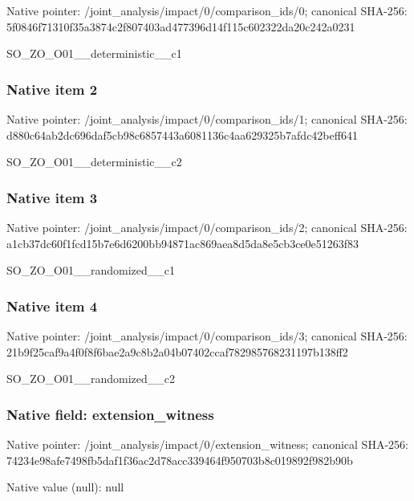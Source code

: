 \documentclass[10pt,a4paper]{article}
\begin{document}
Native pointer: /joint\_analysis/impact/0\allowbreak{}/comparison\_ids/0; canonical SHA-256: 5f0846f71310f35a3874c2f8\allowbreak{}07403ad477396d14f115c602\allowbreak{}322da20c242a0231


SO\_ZO\_O01\_\_deterministic\_\_c1


\subsubsection{Native item 2}


Native pointer: /joint\_analysis/impact/0\allowbreak{}/comparison\_ids/1; canonical SHA-256: d880c64ab2dc696daf5cb98c\allowbreak{}6857443a6081136c4aa62932\allowbreak{}5b7afdc42beff641


SO\_ZO\_O01\_\_deterministic\_\_c2


\subsubsection{Native item 3}


Native pointer: /joint\_analysis/impact/0\allowbreak{}/comparison\_ids/2; canonical SHA-256: a1cb37dc60f1fcd15b7e6d62\allowbreak{}00bb94871ac869aea8d5da8e\allowbreak{}5cb3ce0e51263f83


SO\_ZO\_O01\_\_randomized\_\_c1


\subsubsection{Native item 4}


Native pointer: /joint\_analysis/impact/0\allowbreak{}/comparison\_ids/3; canonical SHA-256: 21b9f25caf9a4f0f8f6bae2a\allowbreak{}9c8b2a04b07402ccaf782985\allowbreak{}768231197b138ff2


SO\_ZO\_O01\_\_randomized\_\_c2


\subsubsection{Native field: extension\_witness}


Native pointer: /joint\_analysis/impact/0\allowbreak{}/extension\_witness; canonical SHA-256: 74234e98afe7498fb5daf1f3\allowbreak{}6ac2d78acc339464f950703b\allowbreak{}8c019892f982b90b



Native value (null): null
\end{document}
